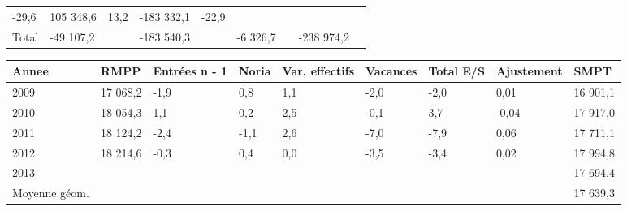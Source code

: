 \begin{longtable}[]{@{}lllllllll@{}}
\begin{minipage}[t]{0.06\columnwidth}
-29,6\strut
\end{minipage} & \begin{minipage}[t]{0.12\columnwidth}\raggedright
105 348,6\strut
\end{minipage} & \begin{minipage}[t]{0.06\columnwidth}\raggedright
13,2\strut
\end{minipage} & \begin{minipage}[t]{0.09\columnwidth}\raggedright
-183 332,1\strut
\end{minipage} & \begin{minipage}[t]{0.06\columnwidth}\raggedright
-22,9\strut
\end{minipage}\tabularnewline
\begin{minipage}[t]{0.05\columnwidth}\raggedright
Total\strut
\end{minipage} & \begin{minipage}[t]{0.10\columnwidth}\raggedright
-49 107,2\strut
\end{minipage} & \begin{minipage}[t]{0.06\columnwidth}\raggedright
\strut
\end{minipage} & \begin{minipage}[t]{0.16\columnwidth}\raggedright
-183 540,3\strut
\end{minipage} & \begin{minipage}[t]{0.06\columnwidth}\raggedright
\strut
\end{minipage} & \begin{minipage}[t]{0.12\columnwidth}\raggedright
-6 326,7\strut
\end{minipage} & \begin{minipage}[t]{0.06\columnwidth}\raggedright
\strut
\end{minipage} & \begin{minipage}[t]{0.09\columnwidth}\raggedright
-238 974,2\strut
\end{minipage} & \begin{minipage}[t]{0.06\columnwidth}\raggedright
\strut
\end{minipage}\tabularnewline
\bottomrule
\end{longtable}

\begin{longtable}[]{@{}lllllllll@{}}
\toprule
Annee & RMPP & Entrées n - 1 & Noria & Var. effectifs & Vacances & Total
E/S & Ajustement & SMPT\tabularnewline
\midrule
\endhead
2009 & 17 068,2 & -1,9 & 0,8 & 1,1 & -2,0 & -2,0 & 0,01 & 16
901,1\tabularnewline
2010 & 18 054,3 & 1,1 & 0,2 & 2,5 & -0,1 & 3,7 & -0,04 & 17
917,0\tabularnewline
2011 & 18 124,2 & -2,4 & -1,1 & 2,6 & -7,0 & -7,9 & 0,06 & 17
711,1\tabularnewline
2012 & 18 214,6 & -0,3 & 0,4 & 0,0 & -3,5 & -3,4 & 0,02 & 17
994,8\tabularnewline
2013 & & & & & & & & 17 694,4\tabularnewline
Moyenne géom. & & & & & & & & 17 639,3\tabularnewline
\bottomrule
\end{longtable}

